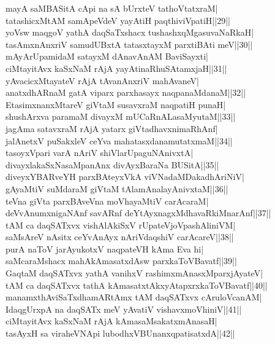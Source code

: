 \documentclass{article}
\begin{document}
mayA saMBASitA cApi na sA bUrxteV tathoVtatxraM|\\
tatashicxMtAM samApeVdeV yayAtiH paqthiviVpatiH||29||\\
yoVsw maqgoV yathA daqSaTxshacx tushashxqMgasuvaNaRkaH|\\
tasAmxnAnxriV samudUBxtA tatasxtayxM parxtiBAti meV||30||\\
mAyArUpamidaM satayxM dAnavAnAM BaviSayxti|\\
ciMtayitAvx kaSxNaM rAjA yayAtinaRhuSAtamxjaH||31||\\
yAvacicxMtayateV rAjA tAvanAnxriV mahAvaneV|\\
anatxdhARnaM gatA viparx parxhasayx naqpanaMdanaM||32||\\
EtasimxnanxMtareV giVtaM susavxraM naqpatiH punaH|\\
shushArxva paramaM divayxM mUCaRnALasaMyutaM||33||\\
jagAma satavxraM rAjA yatarx giVtadhavxnimaRhAnf|\\
jalAnetxV puSakxleV ceYva mahatasxdanamutatxmaM||34||\\
tasoyxVpari varA nAriV shiVlarUpaguNAnivxtA|\\
divayxlakaSxNasaMpanAnx divAyxBaraNa BUSitA||35||\\
diveyxYBARveYH parxBAteyxVkA viVNadaMDakadhAriNiV|\\
gAyaMtiV suMdaraM giVtaM tAlamAnalayAnivxtaM||36||\\
teVna giVta parxBAveVna moVhayaMtiV carAcaraM|\\
deVvAnumxnigaNAnf savARnf deYtAyxnagxMdhavaRkiMnarAnf||37||\\
tAM ca daqSATxvx vishAlAkiSxV rUpateVjoVpashAliniVM|\\
saMsAreV nAsitx ceYvAnAyx nAriVdaqshiV carAcareV||38||\\
purA naToV jarAyukotxV naqpateVH kAma Eva hi|\\
saMcaraMshacx mahAkAmasatxdAsw parxkaToVBavatf||39||\\
GaqtaM daqSATxvx yathA vanihxV rashimxmAnasxMparxjAyateV|\\
tAM ca daqSATxvx tathA kAmasatxtAkxyAtapxrxkaToVBavatf||40||\\
manamxthAviSaTxdhamARtAmx tAM daqSATxvx cAruloVcanAM|\\
IdaqgUrxpA na daqSATx meV yAvatiV vishavxmoVhiniV||41||\\
ciMtayitAvx kaSxNaM rAjA kAmasaMsakatxmAnasaH|\\
tasAyxH sa viraheVNApi lubodhxVBUnanxqpatisatxdA||42||\\
\end{document}
